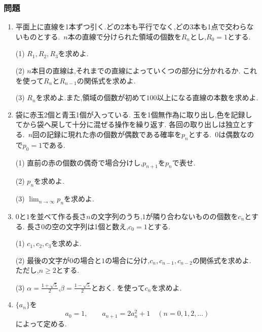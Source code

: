 \subsubsection{問題}\label{節：発展入門：問題}
\begin{enumerate}[label=\textbf{問\arabic*.},leftmargin=3.8em,format=\bookitemlink{practice-bridge}{problem}{hint}]
  \item 平面上に直線を1本ずつ引く.どの2本も平行でなく,どの3本も1点で交わらないものとする.\,
    $n$本の直線で分けられた領域の個数を$R_n$とし,$R_0=1$とする.
    \par\smallskip\noindent
    (1) $R_1,R_2,R_3$を求めよ.
    \par\smallskip\noindent
    (2) $n$本目の直線は,それまでの直線によっていくつの部分に分かれるか.
    これを使って$R_n$と$R_{n-1}$の関係式を求めよ.
    \par\smallskip\noindent
    (3) $R_n$を求めよ.また,領域の個数が初めて$100$以上になる直線の本数を求めよ.
  \item 袋に赤玉2個と青玉1個が入っている.
    玉を1個無作為に取り出し,色を記録してから袋へ戻して十分に混ぜる操作を繰り返す.
    各回の取り出しは独立とする.\,
    $n$回の記録に現れた赤の個数が偶数である確率を$p_n$とする.\,
    $0$は偶数なので$p_0=1$である.
    \par\smallskip\noindent
    (1) 直前の赤の個数の偶奇で場合分けし,$p_{n+1}$を$p_n$で表せ.
    \par\smallskip\noindent
    (2) $p_n$を求めよ.
    \par\smallskip\noindent
    (3) $\lim_{n\to\infty}p_n$を求めよ.
  \item $0$と$1$を並べて作る長さ$n$の文字列のうち,$1$が隣り合わないものの個数を$c_n$とする.
    長さ$0$の空の文字列は1個と数え,$c_0=1$とする.
    \par\smallskip\noindent
    (1) $c_1,c_2,c_3$を求めよ.
    \par\smallskip\noindent
    (2) 最後の文字が$0$の場合と$1$の場合に分け,$c_n,c_{n-1},c_{n-2}$の関係式を求めよ.
    ただし,$n\ge2$とする.
    \par\smallskip\noindent
    (3) $\alpha=\frac{1+\sqrt5}{2}$,$\beta=\frac{1-\sqrt5}{2}$とおく.
    を使って$c_n$を求めよ.
  \item {}$\{a_n\}$を
    \[
      a_0=1,\qquad a_{n+1}=2a_n^2+1
      \quad(n=0,1,2,\ldots)
    \]
    によって定める.

\end{enumerate}
